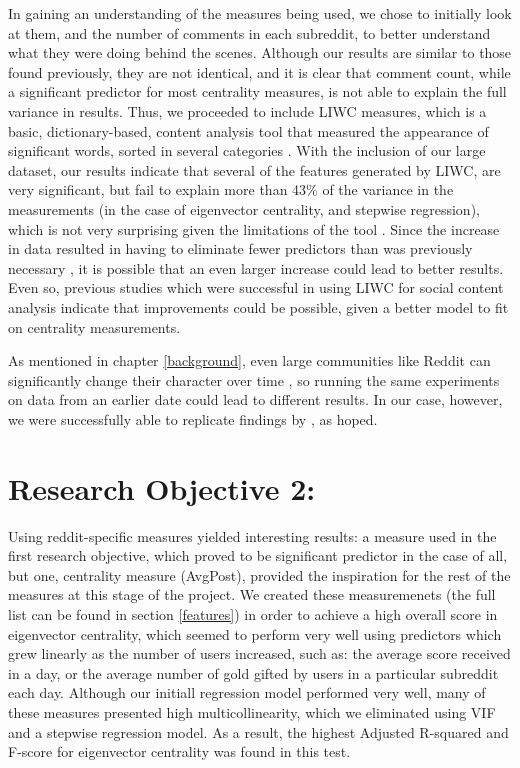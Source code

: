 \documentclass[bsc,frontabs,twoside,singlespacing,parskip,deptreport]{infthesis}
\begin{document}
In gaining an understanding of the measures being used, we chose to initially look at them, and the number of comments in each subreddit, to better understand what they were doing behind the scenes. Although our results are similar to those found previously, they are not identical, and it is clear that comment count, while a significant predictor for most centrality measures, is not able to explain the full variance in results. Thus, we proceeded to include LIWC measures, which is a basic, dictionary-based, content analysis tool that measured the appearance of significant words, sorted in several categories \cite{liwc}. With the inclusion of our large dataset, our results indicate that several of the features generated by LIWC, are very significant, but fail to explain more than 43\% of the variance in the measurements (in the case of eigenvector centrality, and stepwise regression), which is not very surprising given the limitations of the tool \cite{pennebaker2015}. Since the increase in data resulted in having to eliminate fewer predictors than was previously necessary \cite{masters}, it is possible that an even larger increase could lead to better results. Even so, previous studies which were successful in using LIWC for social content analysis \cite{ethayarajhKawin2017TEoP} \cite{harman2014measuring} indicate that improvements could be possible, given a better model to fit on centrality measurements.

As mentioned in chapter \ref{background}, even large communities like Reddit can significantly change their character over time \cite{singer}, so running the same experiments on data from an earlier date could lead to different results. In our case, however, we were successfully able to replicate findings by \cite{masters}, as hoped.

\section{Research Objective 2:}\label{rq2}

Using reddit-specific measures yielded interesting results: a measure used in the first research objective, which proved to be significant predictor in the case of all, but one, centrality measure (AvgPost), provided the inspiration for the rest of the measures at this stage of the project. We created these measuremenets (the full list can be found in section \ref{features}) in order to achieve a high overall score in eigenvector centrality, which seemed to perform very well using predictors which grew linearly as the number of users increased, such as: the average score received in a day, or the average number of gold gifted by users in a particular subreddit each day. Although our initiall regression model performed very well, many of these measures presented high multicollinearity, which we eliminated using VIF and a stepwise regression model. As a result, the highest Adjusted R-squared and F-score for eigenvector centrality was found in this test.
\end{document}
